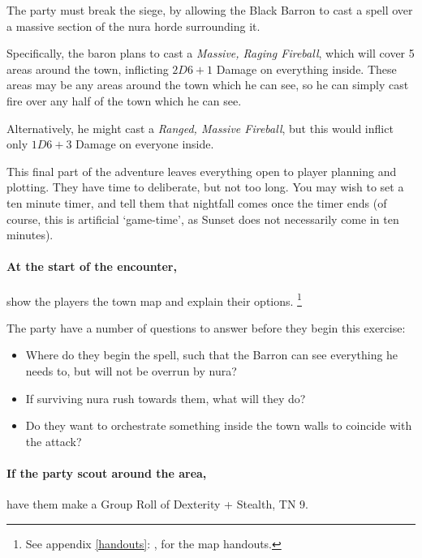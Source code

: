 \begin{multicols}{2}

\noindent
The party must break the siege, by allowing the Black Barron to cast a spell over a massive section of the nura horde surrounding it.

Specifically, the baron plans to cast a \textit{Massive, Raging Fireball}, which will cover 5 areas around the town, inflicting $2D6+1$ Damage on everything inside.
These areas may be any areas around the town which he can see, so he can simply cast fire over any half of the town which he can see.

Alternatively, he might cast a \textit{Ranged, Massive Fireball}, but this would inflict only $1D6 + 3$ Damage on everyone inside.

This final part of the adventure leaves everything open to player planning and plotting.
They have time to deliberate, but not too long.
You may wish to set a ten minute timer, and tell them that nightfall comes once the timer ends (of course, this is artificial `game-time', as Sunset does not necessarily come in ten minutes).

\paragraph{At the start of the encounter,}
show the players the town map and explain their options.%
\footnote{See appendix \ref{handouts}: , for the map handouts.}

The party have a number of questions to answer before they begin this exercise:

\begin{itemize}

	\item{Where do they begin the spell, such that the Barron can see everything he needs to, but will not be overrun by nura?}
	\item{If surviving nura rush towards them, what will they do?}
	\item{Do they want to orchestrate something inside the town walls to coincide with the attack?}

\end{itemize}

\paragraph{If the party scout around the area,}
have them make a Group Roll of Dexterity + Stealth, TN 9.


\end{multicols}
